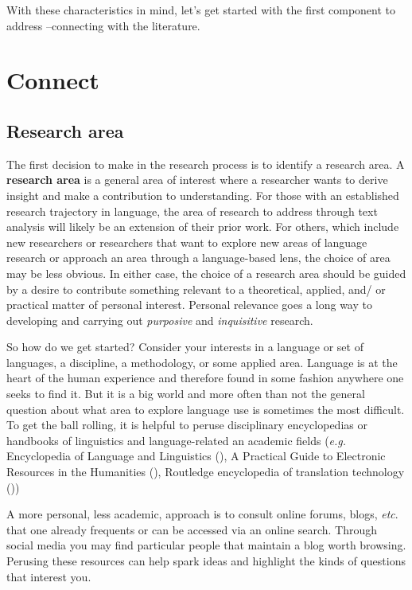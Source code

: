 \documentclass[
  letterpaper,
]{latex/krantz}
\theoremstyle{definition}
\theoremstyle{remark}
\begin{document}
With these characteristics in mind, let's get started with the first
component to address --connecting with the literature.

\section{Connect}\label{sec-fr-connect}

\subsection{Research area}\label{research-area}

The first decision to make in the research process is to identify a
research area. A \textbf{research area} is a general area of interest
where a researcher wants to derive insight and make a contribution to
understanding. For those with an established research trajectory in
language, the area of research to address through text analysis will
likely be an extension of their prior work. For others, which include
new researchers or researchers that want to explore new areas of
language research or approach an area through a language-based lens, the
choice of area may be less obvious. In either case, the choice of a
research area should be guided by a desire to contribute something
relevant to a theoretical, applied, and/ or practical matter of personal
interest. Personal relevance goes a long way to developing and carrying
out \emph{purposive} and \emph{inquisitive} research.

So how do we get started? Consider your interests in a language or set
of languages, a discipline, a methodology, or some applied area.
Language is at the heart of the human experience and therefore found in
some fashion anywhere one seeks to find it. But it is a big world and
more often than not the general question about what area to explore
language use is sometimes the most difficult. To get the ball rolling,
it is helpful to peruse disciplinary encyclopedias or handbooks of
linguistics and language-related an academic fields (\emph{e.g.}
Encyclopedia of Language and Linguistics (), A Practical Guide to Electronic Resources in the Humanities
(), Routledge
encyclopedia of translation technology ())

A more personal, less academic, approach is to consult online forums,
blogs, \emph{etc}. that one already frequents or can be accessed via an
online search. Through social media you may find particular people that
maintain a blog worth browsing. Perusing these resources can help spark
ideas and highlight the kinds of questions that interest you.
\end{document}
